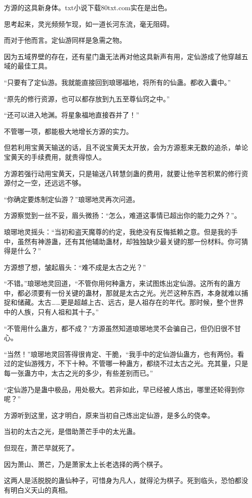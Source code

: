 \begin{this_body}
方源的这具新身体。txt小说下载80txt.com实在是出色。

思考起来，灵光频频乍现，如一道长河东流，毫无阻碍。

而对于他而言。定仙游同样是急需之物。

因为五域界壁的存在，还有星门蛊无法再对他这具新声有用，定仙游成了他穿越五域的最佳工具。

“只要有了定仙游。我就能直接回到琅琊福地，将所有的仙蛊。都收入囊中。”

“原先的修行资源，也可以都存放到九五至尊仙窍之中。”

“还可以进入地渊。将星象福地直接吞并了！”

不管哪一项，都能极大地增长方源的实力。

但若利用宝黄天输送的话，且不说宝黄天太开放，会为方源惹来无数的追杀，单论宝黄天的手续费用，就贵得惊人。

方源若强行动用宝黄天，只是输送八转慧剑蛊的费用，就要让他辛苦积累的修行资源付之一空，还远远不够。

“你确定要炼制定仙游？”琅琊地灵再次问道。

方源察觉到一丝不妥，眉头微扬：“怎么，难道这事情已超出你的能力之外？”。

琅琊地灵摇头：“当初和盗天魔尊的约定，我绝没有反悔抵赖之意。但是我的手中，虽然有神游蛊，还有其他辅助蛊材，却独独缺少最关键的那一份材料。你可猜得是什么？”

方源想了想，皱起眉头：“难不成是太古之光？”

“不错。”琅琊地灵回道，“不管你用何种蛊方，来试图炼出定仙游。这所有的蛊方中，都必须要有一份关键的蛊材，那就是太古之光。光芒这种东西，本身就难以捕捉和储藏。太古……更是超越上古、远古，是人祖存在的年代。那时候，整个世界中的人族，只有人祖和其十子。”

“不管用什么蛊方，都不成？”方源虽然知道琅琊地灵不会骗自己，但仍旧很不甘心。

“当然！”琅琊地灵回答得很肯定、干脆，“我手中的定仙游仙蛊方，也有两份。看过的定仙游残方，不下十种。不管哪一种蛊方，都绕不过太古之光。充其量，只是每一张蛊方中，太古之光的多少，有些差别而已。”

“定仙游乃是蛊中极品，用处极大。若非如此，早已经被人炼出，哪里还轮得到你呢？”

方源听到这里，这才明白，原来当初自己炼出定仙游，是多么的侥幸。

当初的太古之光，是借助萧芒手中的太光蛊。

但现在，萧芒早就死了。

因为萧山、萧芒，乃是萧家太上长老选择的两个棋子。

这两人是活脱脱的蛊仙种子，可惜身为凡人，就得沦为棋子。死到临头，恐怕都没有明白义天山的真相。


\end{this_body}
